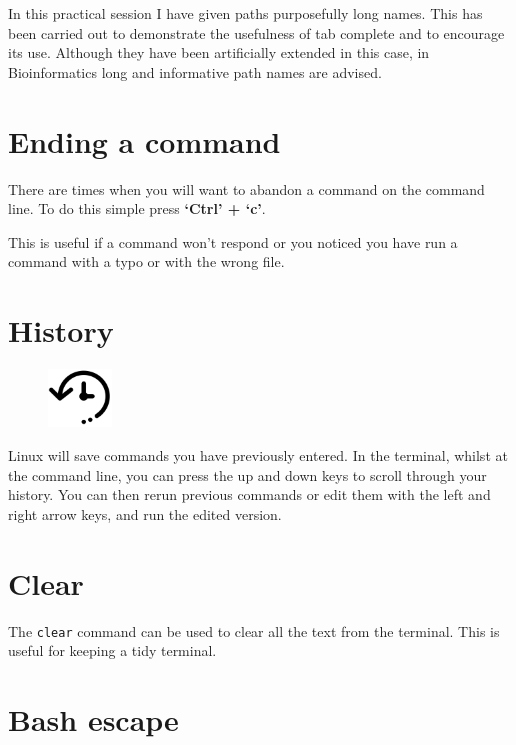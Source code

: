 \documentclass[
  letterpaper,
  DIV=11,
  numbers=noendperiod]{scrreprt}
\begin{document}
In this practical session I have given paths purposefully long names.
This has been carried out to demonstrate the usefulness of tab complete
and to encourage its use. Although they have been artificially extended
in this case, in Bioinformatics long and informative path names are
advised.

\hypertarget{ending-a-command}{%
\section{Ending a command}\label{ending-a-command}}

There are times when you will want to abandon a command on the command
line. To do this simple press \textbf{`Ctrl' + `c'}.

This is useful if a command won't respond or you noticed you have run a
command with a typo or with the wrong file.

\hypertarget{history}{%
\section{History}\label{history}}

\begin{figure}

{\centering \includegraphics[width=0.15\textwidth,height=\textheight]{figures/history.png}

}

\end{figure}

Linux will save commands you have previously entered. In the terminal,
whilst at the command line, you can press the up and down keys to scroll
through your history. You can then rerun previous commands or edit them
with the left and right arrow keys, and run the edited version.

\hypertarget{clear}{%
\section{Clear}\label{clear}}

The \texttt{clear} command can be used to clear all the text from the
terminal. This is useful for keeping a tidy terminal.

\hypertarget{bash-escape}{%
\section{Bash escape}\label{bash-escape}}
\end{document}
